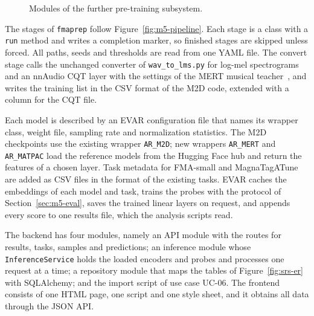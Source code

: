 \documentclass{FastFyp}
\begin{document}
\begin{figure}[htbp]
\caption[Modules of the further pre-training subsystem]{Modules of the further pre-training subsystem.}
\label{fig:des-train}
\end{figure}

The stages of \texttt{fmaprep} follow Figure~\ref{fig:m5-pipeline}. Each stage is a class with a \texttt{run} method and writes a completion marker, so finished stages are skipped unless forced. All paths, seeds and thresholds are read from one YAML file. The convert stage calls the unchanged converter of \texttt{wav\_to\_lms.py} for log-mel spectrograms and an nnAudio CQT layer with the settings of the MERT musical teacher~\cite{ref:MERTGit}, and writes the training list in the CSV format of the M2D code, extended with a column for the CQT file.

Each model is described by an EVAR configuration file that names its wrapper class, weight file, sampling rate and normalization statistics. The M2D checkpoints use the existing wrapper \texttt{AR\_M2D}; new wrappers \texttt{AR\_MERT} and \texttt{AR\_MATPAC} load the reference models from the Hugging Face hub and return the features of a chosen layer. Task metadata for FMA-small and MagnaTagATune are added as CSV files in the format of the existing tasks. EVAR caches the embeddings of each model and task, trains the probes with the protocol of Section~\ref{sec:m5-eval}, saves the trained linear layers on request, and appends every score to one results file, which the analysis scripts read.

The backend has four modules, namely an API module with the routes for results, tasks, samples and predictions; an inference module whose \texttt{InferenceService} holds the loaded encoders and probes and processes one request at a time; a repository module that maps the tables of Figure~\ref{fig:srs-er} with SQLAlchemy; and the import script of use case UC-06. The frontend consists of one HTML page, one script and one style sheet, and it obtains all data through the JSON API.
\end{document}
